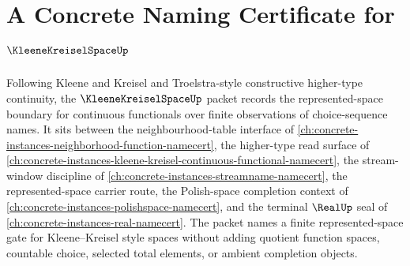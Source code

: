 \chapter{A Concrete Naming Certificate for $\KleeneKreiselSpaceUp$}
\label{ch:concrete-instances-kleene-kreisel-space-namecert}

Following Kleene and Kreisel and Troelstra-style constructive higher-type continuity, the $\KleeneKreiselSpaceUp$ packet records the represented-space boundary for continuous functionals over finite observations of choice-sequence names. It sits between the neighbourhood-table interface of \autoref{ch:concrete-instances-neighborhood-function-namecert}, the higher-type read surface of \autoref{ch:concrete-instances-kleene-kreisel-continuous-functional-namecert}, the stream-window discipline of \autoref{ch:concrete-instances-streamname-namecert}, the represented-space carrier route, the Polish-space completion context of \autoref{ch:concrete-instances-polishspace-namecert}, and the terminal $\RealUp$ seal of \autoref{ch:concrete-instances-real-namecert}. The packet names a finite represented-space gate for Kleene--Kreisel style spaces without adding quotient function spaces, countable choice, selected total elements, or ambient completion objects.

